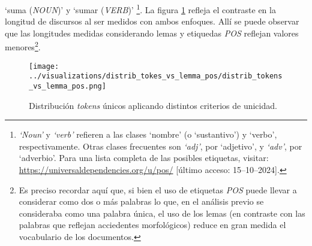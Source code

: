 `suma (\textit{NOUN})' y `sumar (\textit{VERB})'
\footnote{\textit{`Noun'} y \textit{`verb'} refieren a las clases `nombre'
(o `sustantivo') y `verbo', respectivamente. Otras clases frecuentes son \textit{`adj'},
por `adjetivo', y \textit{`adv'}, por `adverbio'. Para una lista completa
de las posibles etiquetas, visitar: \url{https://universaldependencies.org/u/pos/}
[\'ultimo acceso: 15--10--2024].}. La figura \ref{fig-distrib-unique-tokens} refleja el contraste
en la longitud de discursos al ser medidos con ambos enfoques.
All\'i se puede observar que las longitudes medidas considerando lemas y etiquedas
\textit{POS} reflejan valores menores\footnote{Es preciso recordar aqu\'i
que, si bien el uso de etiquetas \textit{POS} puede llevar a considerar
como dos o m\'as palabras lo que, en el an\'alisis previo se consideraba
como una palabra \'unica, el uso de los lemas (en contraste con
las palabras que reflejan acciedentes morfol\'ogicos) reduce en gran
medida el vocabulario de los documentos.}.

\begin{figure}[h!]
\centering
\texttt{[image: ../visualizations/distrib\_tokes\_vs\_lemma\_pos/distrib\_tokens\_vs\_lemma\_pos.png]}
\caption{Distribuci\'on \textit{tokens} \'unicos aplicando distintos criterios de unicidad.}
\label{fig-distrib-unique-tokens}
\end{figure}